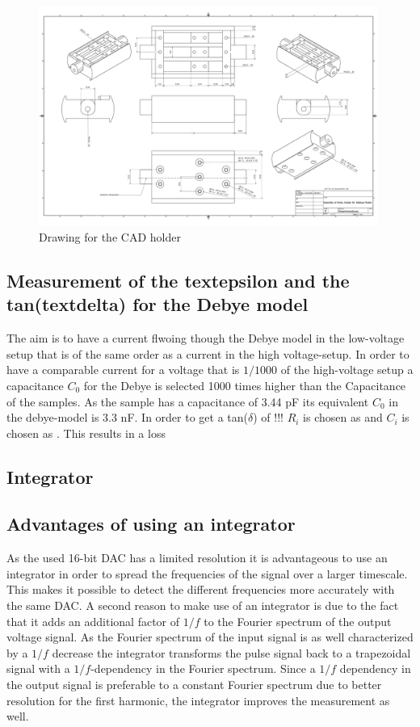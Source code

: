 \begin{figure}
\includegraphics[width=0.99\textwidth]{figures/Gesamtanordnung.pdf}
    \caption{Drawing for the CAD holder}
    \label{fig.CADdrawing}
   \end{figure}	
\newpage
    

\subsection{Measurement of the textepsilon and the tan(textdelta) for the Debye model}

The aim is to have a current flwoing though the Debye model in the low-voltage setup that is of the same order as a current in the high voltage-setup. In order to have a comparable current for a voltage that is $1/1000$ of the high-voltage setup a capacitance $C_0$ for the Debye is selected 1000 times higher than the Capacitance of the samples. As the sample has a capacitance of 3.44 pF its equivalent $C_0$ in the debye-model is 3.3 nF. In order to get a tan($\delta$) of !!! $R_i$ is chosen as and $C_i$ is chosen as . This results in a loss 



\subsection{Integrator}
\subsection{Advantages of using an integrator}
As the used 16-bit DAC has a limited resolution it is advantageous to use an integrator in order to spread the frequencies of the signal over a larger timescale. This makes it possible to detect the different frequencies more accurately with the same DAC. 
A second reason to make use of an integrator is due to the fact that it adds an additional factor of $1/f$ to the Fourier spectrum of the output voltage signal. As the Fourier spectrum of the input signal is as well characterized by a $1/f$ decrease the integrator transforms the pulse signal back to a trapezoidal signal with a $1/f$-dependency in the Fourier spectrum. Since a $1/f$ dependency in the output signal is preferable to a constant Fourier spectrum due to better resolution for the first harmonic, the integrator improves the measurement as well. 

